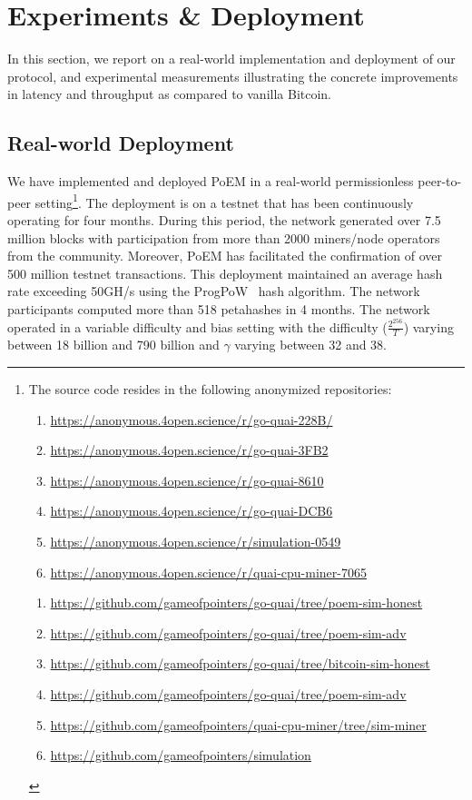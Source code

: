 \section{Experiments \& Deployment}\label{sec:experiments}

In this section, we report on a real-world implementation and deployment of our
protocol, and experimental measurements illustrating the concrete improvements
in latency and throughput as compared to vanilla Bitcoin.

\subsection{Real-world Deployment}\label{sec:deployment}

We have implemented and deployed PoEM in a real-world permissionless peer-to-peer
setting\footnote{
    The source code resides in the following \ifanonymous anonymized \fi repositories:
    \ifanonymous
    \begin{enumerate}
        \item \url{https://anonymous.4open.science/r/go-quai-228B/}
        \item \url{https://anonymous.4open.science/r/go-quai-3FB2}
        \item \url{https://anonymous.4open.science/r/go-quai-8610}
        \item \url{https://anonymous.4open.science/r/go-quai-DCB6}
        \item \url{https://anonymous.4open.science/r/simulation-0549}
        \item \url{https://anonymous.4open.science/r/quai-cpu-miner-7065}
    \end{enumerate}
    \else
    \begin{enumerate}
        \item \url{https://github.com/gameofpointers/go-quai/tree/poem-sim-honest}
        \item \url{https://github.com/gameofpointers/go-quai/tree/poem-sim-adv}
        \item \url{https://github.com/gameofpointers/go-quai/tree/bitcoin-sim-honest}
        \item \url{https://github.com/gameofpointers/go-quai/tree/poem-sim-adv}
        \item \url{https://github.com/gameofpointers/quai-cpu-miner/tree/sim-miner}
        \item \url{https://github.com/gameofpointers/simulation}
    \end{enumerate}
    \fi
}.
The deployment is on a testnet that has been continuously operating for
four months. During this period, the network generated over 7.5 million blocks
with participation from
more than 2000 miners/node operators from the community. Moreover, PoEM has facilitated the
confirmation of over 500 million testnet transactions. This deployment maintained an
average hash rate exceeding 50GH/s using the ProgPoW~\cite{progpow} hash algorithm.
The network participants computed more than 518 petahashes in 4 months.
The network operated in a variable difficulty and bias setting with the difficulty ($\frac{2^{256}}{T}$)
varying between 18 billion and 790 billion and $\gamma$ varying between 32 and 38.

